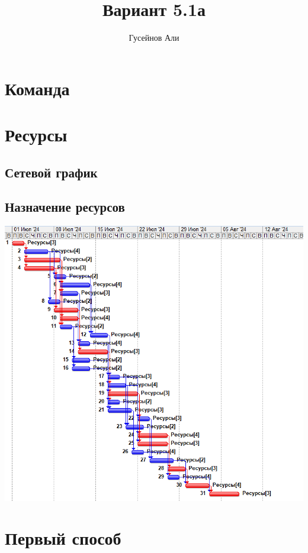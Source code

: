 \documentclass{article}
\title{Вариант 5.1а}
\author{Гусейнов Али}
\begin{document}
\maketitle
\tableofcontents
\clearpage
\section{Команда}
\section{Ресурсы}
	\subsection{Сетевой график}
	\subsection{Назначение ресурсов}
	\includegraphics[width=\textwidth]{../img/init_network_graph.png}
\section{Первый способ}
	
\end{document}
